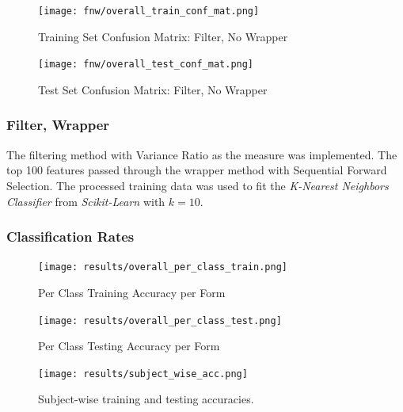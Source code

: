 \documentclass[12pt,twoside,a4paper]{article}
\begin{document}
\begin{figure}[H]
    \centering
    \texttt{[image: fnw/overall\_train\_conf\_mat.png]}
    \caption{Training Set Confusion Matrix: Filter, No Wrapper}
    \label{fig: F4}
\end{figure}

\begin{figure}[H]
    \centering
    \texttt{[image: fnw/overall\_test\_conf\_mat.png]}
    \caption{Test Set Confusion Matrix: Filter, No Wrapper}
    \label{fig: F5}
\end{figure}

\subsubsection{Filter, Wrapper}

The filtering method with Variance Ratio as the measure was implemented. The top 100 features passed through the wrapper method with Sequential Forward Selection. The processed training data was used to fit the \textit{K-Nearest Neighbors Classifier} from \textit{Scikit-Learn} with $k=10$.

\subsubsection*{Classification Rates}

\begin{figure}[H]
    \centering
    \texttt{[image: results/overall\_per\_class\_train.png]}
    \caption{Per Class Training Accuracy per Form}
    \label{fig: FW1}
\end{figure}

\begin{figure}[H]
    \centering
    \texttt{[image: results/overall\_per\_class\_test.png]}
    \caption{Per Class Testing Accuracy per Form}
    \label{fig: FW2}
\end{figure}

\begin{figure}[H]
    \centering
    \texttt{[image: results/subject\_wise\_acc.png]}
    \caption{Subject-wise training and testing accuracies.}
    \label{fig: FW3}
\end{figure}
\end{document}
